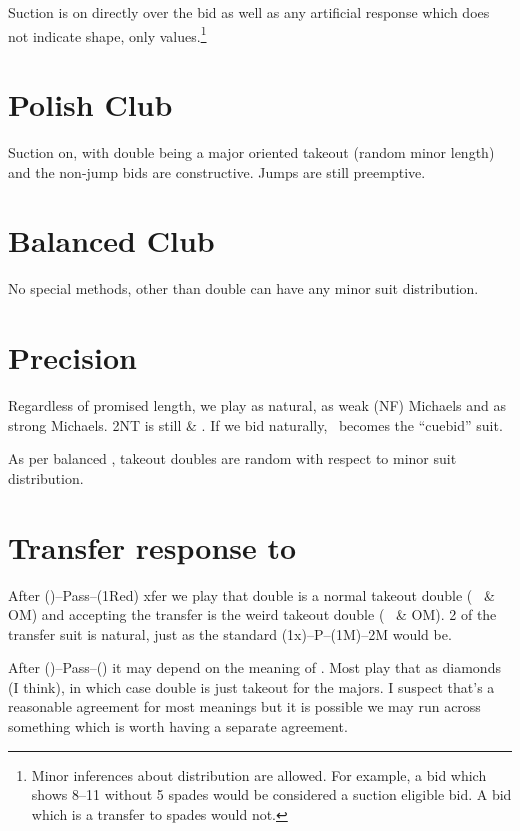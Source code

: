\documentclass[main]{subfile}
\begin{document}
	Suction is on directly over the  bid as well as any artificial response which does not indicate shape, only values.\footnote{Minor inferences about distribution are allowed. For example, a  bid which shows 8--11 without 5 spades would be considered a suction eligible bid. A  bid which is a transfer to spades would not.}
	
	\section{Polish Club}
	
	Suction on, with double being a major oriented takeout (random minor length) and the non-jump bids are constructive. Jumps are still preemptive.
	
	\section{Balanced Club}
	
	No special methods, other than double can have any minor suit distribution.
	
	\section[Precision 1D]{Precision }
	
	Regardless of promised length, we play  as natural,  as weak (NF) Michaels and  as strong Michaels. 2NT is still \heartsuit \& \clubsuit. If we bid  naturally, \clubsuit ~becomes the ``cuebid'' suit.
	
	As per balanced , takeout doubles are random with respect to minor suit distribution.
	
	\section[Transfer response to 1C]{Transfer response to }
	
	After ()--Pass--(1Red) xfer we play that double is a normal takeout double (\ddd~ \& OM) and accepting the transfer is the weird takeout double (\ccc~ \& OM). 2 of the transfer suit is natural, just as the standard (1x)--P--(1M)--2M would be.
	
	After ()--Pass--() it may depend on the meaning of . Most play that as diamonds (I think), in which case double is just takeout for the majors. I suspect that's a reasonable agreement for most  meanings but it is possible we may run across something which is worth having a separate agreement.
	
\end{document}

